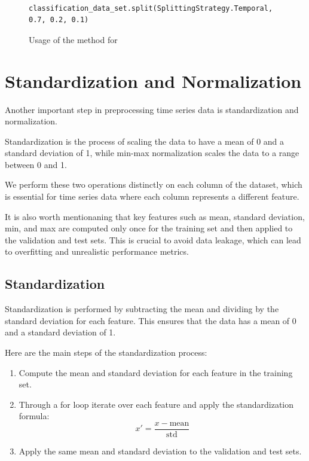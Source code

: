\documentclass[review]{AIM_report}
\begin{document}
\begin{figure}[H]
    \begin{lstlisting}[style=python]

classification_data_set.split(SplittingStrategy.Temporal, 0.7, 0.2, 0.1)
    \end{lstlisting}
    \caption{Usage of the \splitShort method for \classificationDataSet}
    \label{fig:usage_splitting}
\end{figure}

\newpage
\section{Standardization and Normalization}
Another important step in preprocessing time series data is standardization and normalization.

Standardization is the process of scaling the data to have a mean of 0 and a standard deviation of 1, while min-max normalization scales the data to a range between 0 and 1.

We perform these two operations distinctly on each column of the dataset, which is essential for time series data where each column represents a different feature.

It is also worth mentionaning that key features such as mean, standard deviation, min, and max are computed only once for the training set and then applied to the validation and test sets. This is crucial to avoid data leakage, which can lead to overfitting and unrealistic performance metrics.

\subsection{Standardization}

Standardization is performed by subtracting the mean and dividing by the standard deviation for each feature. This ensures that the data has a mean of 0 and a standard deviation of 1.

Here are the main steps of the standardization process:
\begin{enumerate}
    \item Compute the mean and standard deviation for each feature in the training set.
    \item Through a for loop iterate over each feature and apply the standardization formula:
          \begin{equation}
              x' = \frac{x - \text{mean}}{\text{std}}
          \end{equation}
    \item Apply the same mean and standard deviation to the validation and test sets.
\end{enumerate}
\end{document}
